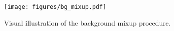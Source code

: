 \begin{figure}[t]
\centering
\texttt{[image: figures/bg\_mixup.pdf]}
\caption{
Visual illustration of the background mixup procedure.
}\label{fig:method-bg}
\end{figure}
